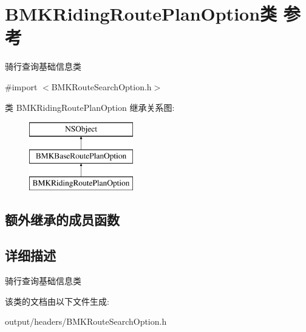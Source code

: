 \hypertarget{interface_b_m_k_riding_route_plan_option}{}\section{B\+M\+K\+Riding\+Route\+Plan\+Option类 参考}
\label{interface_b_m_k_riding_route_plan_option}


骑行查询基础信息类  




{\ttfamily \#import $<$B\+M\+K\+Route\+Search\+Option.\+h$>$}

类 B\+M\+K\+Riding\+Route\+Plan\+Option 继承关系图\+:\begin{figure}[H]
\begin{center}
\leavevmode
\includegraphics[height=3.000000cm]{interface_b_m_k_riding_route_plan_option}
\end{center}
\end{figure}
\subsection*{额外继承的成员函数}


\subsection{详细描述}
骑行查询基础信息类 

该类的文档由以下文件生成\+:\begin{DoxyCompactItemize}
\item 
output/headers/B\+M\+K\+Route\+Search\+Option.\+h\end{DoxyCompactItemize}
